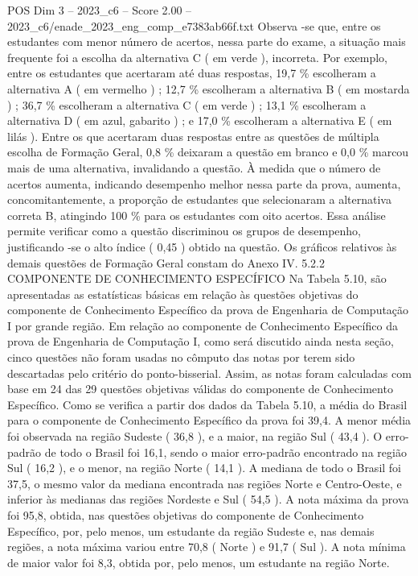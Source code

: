 \begin{textsample}{POS Dim 3 – 2023\_c6 – Score 2.00 – 2023\_c6/enade\_2023\_eng\_comp\_e7383ab66f.txt}
Observa -se que, entre os estudantes com menor número de acertos, nessa parte do exame, a situação mais frequente foi a escolha da alternativa C ( em verde ), incorreta.
Por exemplo, entre os estudantes que acertaram até duas respostas, 19,7 \% escolheram a alternativa A ( em vermelho ) ; 12,7 \% escolheram a alternativa B ( em mostarda ) ; 36,7 \% escolheram a alternativa C ( em verde ) ; 13,1 \% escolheram a alternativa D ( em azul, gabarito ) ; e 17,0 \% escolheram a alternativa E ( em lilás ).
Entre os que acertaram duas respostas entre as questões de múltipla escolha de Formação Geral, 0,8 \% deixaram a questão em branco e 0,0 \% marcou mais de uma alternativa, invalidando a questão.
À medida que o número de acertos aumenta, indicando desempenho melhor nessa parte da prova, aumenta, concomitantemente, a proporção de estudantes que selecionaram a alternativa correta B, atingindo 100 \% para os estudantes com oito acertos.
Essa análise permite verificar como a questão discriminou os grupos de desempenho, justificando -se o alto índice ( 0,45 ) obtido na questão.
Os gráficos relativos às demais questões de Formação Geral constam do Anexo IV. 5.2.2 COMPONENTE DE CONHECIMENTO ESPECÍFICO Na Tabela 5.10, são apresentadas as estatísticas básicas em relação às questões objetivas do componente de Conhecimento Específico da prova de Engenharia de Computação I por grande região.
Em relação ao componente de Conhecimento Específico da prova de Engenharia de Computação I, como será discutido ainda nesta seção, cinco questões não foram usadas no cômputo das notas por terem sido descartadas pelo critério do ponto-bisserial.
Assim, as notas foram calculadas com base em 24 das 29 questões objetivas válidas do componente de Conhecimento Específico.
Como se verifica a partir dos dados da Tabela 5.10, a média do Brasil para o componente de Conhecimento Específico da prova foi 39,4.
A menor média foi observada na região Sudeste ( 36,8 ), e a maior, na região Sul ( 43,4 ).
O erro-padrão de todo o Brasil foi 16,1, sendo o maior erro-padrão encontrado na região Sul ( 16,2 ), e o menor, na região Norte ( 14,1 ).
A mediana de todo o Brasil foi 37,5, o mesmo valor da mediana encontrada nas regiões Norte e Centro-Oeste, e inferior às medianas das regiões Nordeste e Sul ( 54,5 ).
A nota máxima da prova foi 95,8, obtida, nas questões objetivas do componente de Conhecimento Específico, por, pelo menos, um estudante da região Sudeste e, nas demais regiões, a nota máxima variou entre 70,8 ( Norte ) e 91,7 ( Sul ).
A nota mínima de maior valor foi 8,3, obtida por, pelo menos, um estudante na região Norte.

\end{textsample}
